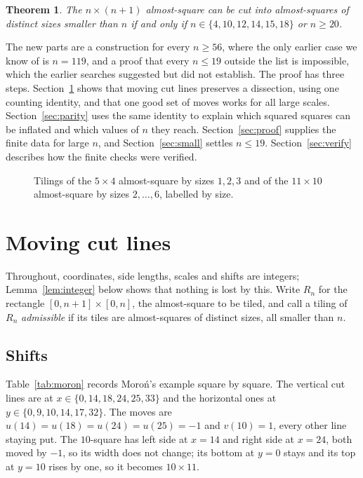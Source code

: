 \documentclass[11pt]{amsart}
\newtheorem{thm}{Theorem}
\theoremstyle{definition}
\newcommand{\R}{R}
\begin{document}
\begin{thm}\label{thm:main}
The $n\times(n+1)$ almost-square can be cut into almost-squares of distinct sizes smaller than $n$
if and only if $n\in\{4,10,12,14,15,18\}$ or $n\ge20$.
\end{thm}

The new parts are a construction for every $n\ge56$, where the only earlier case we know of is $n=119$,
and a proof that every $n\le19$ outside the list is impossible, which the earlier searches suggested but
did not establish. The proof has three steps. Section~\ref{sec:inflation} shows that moving cut lines preserves a
dissection, using one counting identity, and that one good set of moves works for all large scales.
Section~\ref{sec:parity} uses the same identity to explain which squared squares can be inflated
and which values of $n$ they reach. Section~\ref{sec:proof} supplies the finite data for large $n$,
and Section~\ref{sec:small} settles $n\le19$. Section~\ref{sec:verify} describes how the finite
checks were verified.

\begin{figure}[ht]
\centering

\caption{Tilings of the $5\times4$ almost-square by sizes $1,2,3$ and of the $11\times10$ almost-square
by sizes $2,\dots,6$, labelled by size.}
\label{fig:small}
\end{figure}

\section{Moving cut lines}\label{sec:inflation}

Throughout, coordinates, side lengths, scales and shifts are integers; Lemma~\ref{lem:integer}
below shows that nothing is lost by this. Write $\R_n$ for the rectangle $[0,n+1]\times[0,n]$, the
almost-square to be tiled, and call a tiling of $\R_n$ \emph{admissible} if its tiles are
almost-squares of distinct sizes, all smaller than $n$.

\subsection*{Shifts} Table~\ref{tab:moron} records Moro\'n's example square by square. The vertical
cut lines are at $x\in\{0,14,18,24,25,33\}$ and the horizontal ones at $y\in\{0,9,10,14,17,32\}$. The
moves are $u(14)=u(18)=u(24)=u(25)=-1$ and $v(10)=1$, every other line staying put. The $10$-square
has left side at $x=14$ and right side at $x=24$, both moved by $-1$, so its width does not change;
its bottom at $y=0$ stays and its top at $y=10$ rises by one, so it becomes $10\times11$.
\end{document}
